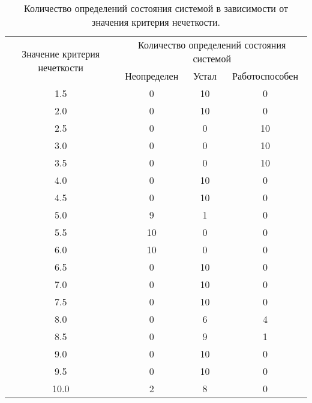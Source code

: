 \begin{table}[H]
	\begin{center}
		\caption{\label{table:time3} Количество определений состояния системой в зависимости от значения критерия нечеткости.}
\begin{tabular}{|c|ccc|}
\hline
\multirow{2}{*}{Значение критерия нечеткости} & \multicolumn{3}{c|}{Количество определений состояния системой}\\ \cline{2-4} & \multicolumn{1}{c|}{Неопределен} & \multicolumn{1}{c|}{Устал} & Работоспособен \\ \hline
1.5& \multicolumn{1}{c|}{0}            & \multicolumn{1}{c|}{10}    &0 \\ \hline
2.0& \multicolumn{1}{c|}{0}            & \multicolumn{1}{c|}{10}      &0 \\ \hline
2.5& \multicolumn{1}{c|}{0}            & \multicolumn{1}{c|}{0}      &10 \\ \hline
3.0& \multicolumn{1}{c|}{0}            & \multicolumn{1}{c|}{0}      &10 \\ \hline
3.5& \multicolumn{1}{c|}{0}            & \multicolumn{1}{c|}{0}      &10 \\ \hline
4.0& \multicolumn{1}{c|}{0}            & \multicolumn{1}{c|}{10}      &0 \\ \hline
4.5& \multicolumn{1}{c|}{0}            & \multicolumn{1}{c|}{10}      &0 \\ \hline
5.0& \multicolumn{1}{c|}{9}            & \multicolumn{1}{c|}{1}      &0 \\ \hline
5.5& \multicolumn{1}{c|}{10}            & \multicolumn{1}{c|}{0}      &0 \\ \hline
6.0& \multicolumn{1}{c|}{10}            & \multicolumn{1}{c|}{0}      &0 \\ \hline
6.5& \multicolumn{1}{c|}{0}            & \multicolumn{1}{c|}{10}      &0 \\ \hline
7.0& \multicolumn{1}{c|}{0}            & \multicolumn{1}{c|}{10}      &0 \\ \hline
7.5& \multicolumn{1}{c|}{0}            & \multicolumn{1}{c|}{10}      &0 \\ \hline
8.0& \multicolumn{1}{c|}{0}            & \multicolumn{1}{c|}{6}      &4 \\ \hline
8.5& \multicolumn{1}{c|}{0}            & \multicolumn{1}{c|}{9}      &1 \\ \hline
9.0& \multicolumn{1}{c|}{0}            & \multicolumn{1}{c|}{10}      &0 \\ \hline
9.5& \multicolumn{1}{c|}{0}            & \multicolumn{1}{c|}{10}      &0 \\ \hline
10.0& \multicolumn{1}{c|}{2}            & \multicolumn{1}{c|}{8}     &0 \\ \hline
\end{tabular}
	\end{center}
\end{table}

\pagebreak